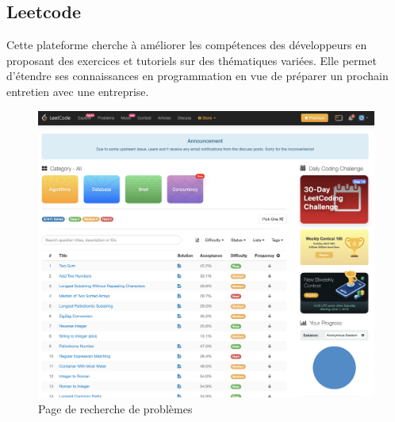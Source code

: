 \pagebreak
\subsection*{Leetcode}

Cette plateforme cherche à améliorer les compétences des développeurs en proposant des exercices et tutoriels sur des thématiques variées. Elle permet d'étendre ses connaissances en programmation en vue de préparer un prochain entretien avec une entreprise.

\begin{figure}[H]
    \includegraphics[width=\textwidth,height=0.6\textheight,keepaspectratio]{images/comparison/leetcode-1.png}
    \centering
    \caption[Leetcode : page de recherche de problèmes]{Page de recherche de problèmes}
\end{figure}

